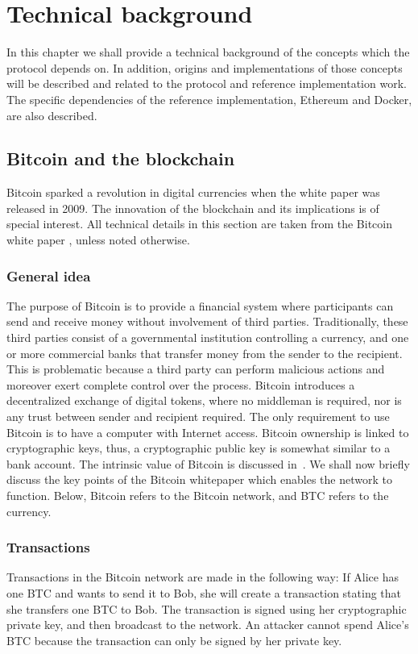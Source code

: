 \chapter{Technical background}
In this chapter we shall provide a technical background of the concepts which the protocol depends on. In addition, origins and implementations of those concepts will be described and related to the protocol and reference implementation work. The specific dependencies of the reference implementation, Ethereum and Docker, are also described.

\section{Bitcoin and the blockchain}
Bitcoin sparked a revolution in digital currencies when the white paper was released in 2009. The innovation of the blockchain and its implications is of special interest. All technical details in this section are taken from the Bitcoin white paper \cite{btc}, unless noted otherwise.

\subsection{General idea}
The purpose of Bitcoin is to provide a financial system where participants can send and receive money without involvement of third parties. Traditionally, these third parties consist of a governmental institution controlling a currency, and one or more commercial banks that transfer money from the sender to the recipient. This is problematic because a third party can perform malicious actions and moreover exert complete control over the process. Bitcoin introduces a decentralized exchange of digital tokens, where no middleman is required, nor is any trust between sender and recipient required. The only requirement to use Bitcoin is to have a computer with Internet access. Bitcoin ownership is linked to cryptographic keys, thus, a cryptographic public key is somewhat similar to a bank account. The intrinsic value of Bitcoin is discussed in~\cite{buterin:2011}. We shall now briefly discuss the key points of the Bitcoin whitepaper which enables the network to function. Below, Bitcoin refers to the Bitcoin network, and BTC refers to the currency.

\subsection{Transactions}
Transactions in the Bitcoin network are made in the following way: If Alice has one BTC and wants to send it to Bob, she will create a transaction stating that she transfers one BTC to Bob. The transaction is signed using her cryptographic private key, and then broadcast to the network. An attacker cannot spend Alice's BTC because the transaction can only be signed by her private key.

